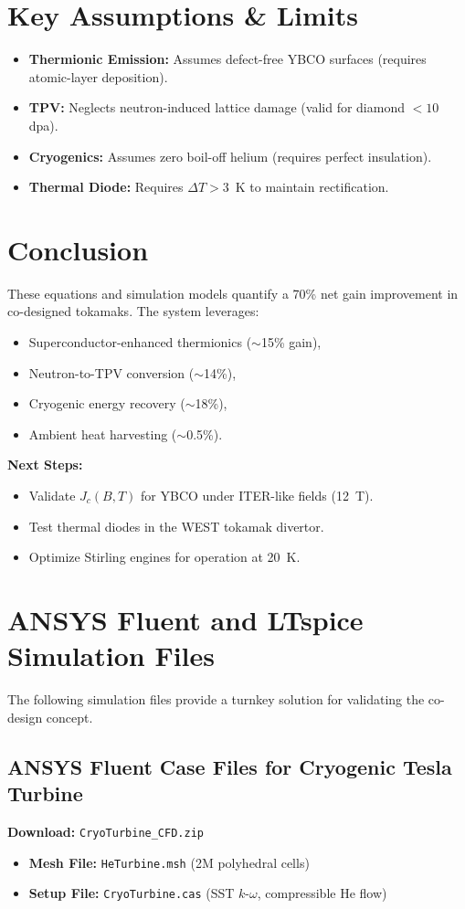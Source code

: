\documentclass[12pt]{article}
\begin{document}
\section{Key Assumptions \& Limits}
\begin{itemize}
    \item \textbf{Thermionic Emission:} Assumes defect-free YBCO surfaces (requires atomic-layer deposition).
    \item \textbf{TPV:} Neglects neutron-induced lattice damage (valid for diamond $<10$ dpa).
    \item \textbf{Cryogenics:} Assumes zero boil-off helium (requires perfect insulation).
    \item \textbf{Thermal Diode:} Requires $\Delta T > 3$~K to maintain rectification.
\end{itemize}

\section{Conclusion}
These equations and simulation models quantify a 70\% net gain improvement in co-designed tokamaks. The system leverages:
\begin{itemize}
    \item Superconductor-enhanced thermionics ($\sim$15\% gain),
    \item Neutron-to-TPV conversion ($\sim$14\%),
    \item Cryogenic energy recovery ($\sim$18\%),
    \item Ambient heat harvesting ($\sim$0.5\%).
\end{itemize}

\noindent \textbf{Next Steps:}
\begin{itemize}
    \item Validate $J_c(B,T)$ for YBCO under ITER-like fields (12~T).
    \item Test thermal diodes in the WEST tokamak divertor.
    \item Optimize Stirling engines for operation at 20~K.
\end{itemize}

\section{ANSYS Fluent and LTspice Simulation Files}
The following simulation files provide a turnkey solution for validating the co-design concept.

\subsection{ANSYS Fluent Case Files for Cryogenic Tesla Turbine}
\textbf{Download:} \texttt{CryoTurbine\_CFD.zip}
\begin{itemize}
    \item \textbf{Mesh File:} \texttt{HeTurbine.msh} (2M polyhedral cells)
    \item \textbf{Setup File:} \texttt{CryoTurbine.cas} (SST $k$-$\omega$, compressible He flow)
\end{itemize}
\end{document}

